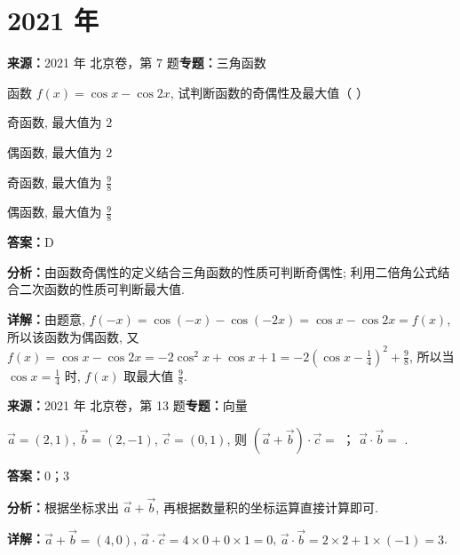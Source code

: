 \section*{2021 年}

\begin{question}[points=4]
\textbf{来源：}2021 年 北京卷，第 7 题\quad \textbf{专题：}三角函数\par
函数 $f(x)=\cos x-\cos 2x$, 试判断函数的奇偶性及最大值（ ）
\begin{choices}
  \item 奇函数, 最大值为 $2$
  \item 偶函数, 最大值为 $2$
  \item 奇函数, 最大值为 $\frac{9}{8}$
  \item 偶函数, 最大值为 $\frac{9}{8}$
\end{choices}
\begin{solution}
\textbf{答案：}D

\textbf{分析：}由函数奇偶性的定义结合三角函数的性质可判断奇偶性; 利用二倍角公式结合二次函数的性质可判断最大值.

\textbf{详解：}由题意, $f(-x)=\cos(-x)-\cos(-2x)=\cos x-\cos 2x=f(x)$, 所以该函数为偶函数, 又 $f(x)=\cos x-\cos 2x=-2\cos^2 x+\cos x+1=-2\left(\cos x-\frac{1}{4}\right)^2+\frac{9}{8}$, 所以当 $\cos x=\frac{1}{4}$ 时, $f(x)$ 取最大值 $\frac{9}{8}$.
\end{solution}
\end{question}

\begin{question}[points=5]
\textbf{来源：}2021 年 北京卷，第 13 题\quad \textbf{专题：}向量\par
$\vec{a}=(2,1)$, $\vec{b}=(2,-1)$, $\vec{c}=(0,1)$, 则 $(\vec{a}+\vec{b})\cdot\vec{c}=$ ； $\vec{a}\cdot\vec{b}=$ .
\fillin[{$0$；$3$}]
\begin{solution}
\textbf{答案：}$0$；$3$

\textbf{分析：}根据坐标求出 $\vec{a}+\vec{b}$, 再根据数量积的坐标运算直接计算即可.

\textbf{详解：}$\vec{a}+\vec{b}=(4,0)$, $\vec{a}\cdot\vec{c}=4\times0+0\times1=0$, $\vec{a}\cdot\vec{b}=2\times2+1\times(-1)=3$.
\end{solution}
\end{question}

